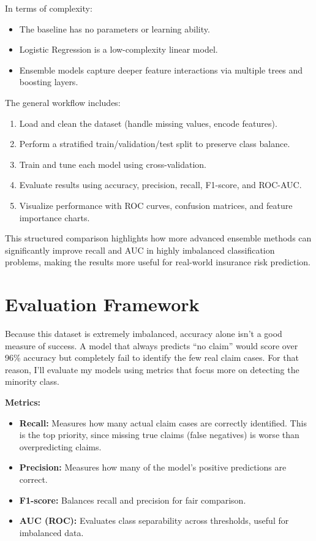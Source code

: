 \documentclass[11pt]{article}
\begin{document}
In terms of complexity:
\begin{itemize}
    \item The baseline has no parameters or learning ability.
    \item Logistic Regression is a low-complexity linear model.
    \item Ensemble models capture deeper feature interactions via multiple trees and boosting layers.
\end{itemize}

The general workflow includes:
\begin{enumerate}
    \item Load and clean the dataset (handle missing values, encode features).
    \item Perform a stratified train/validation/test split to preserve class balance.
    \item Train and tune each model using cross-validation.
    \item Evaluate results using accuracy, precision, recall, F1-score, and ROC-AUC.
    \item Visualize performance with ROC curves, confusion matrices, and feature importance charts.
\end{enumerate}

This structured comparison highlights how more advanced ensemble methods can significantly improve recall and AUC in highly imbalanced classification problems, making the results more useful for real-world insurance risk prediction.

\section{Evaluation Framework}
Because this dataset is extremely imbalanced, accuracy alone isn’t a good measure of success. A model that always predicts “no claim” would score over 96\% accuracy but completely fail to identify the few real claim cases. For that reason, I’ll evaluate my models using metrics that focus more on detecting the minority class.

\textbf{Metrics:}
\begin{itemize}
    \item \textbf{Recall:} Measures how many actual claim cases are correctly identified. This is the top priority, since missing true claims (false negatives) is worse than overpredicting claims.
    \item \textbf{Precision:} Measures how many of the model’s positive predictions are correct.
    \item \textbf{F1-score:} Balances recall and precision for fair comparison.
    \item \textbf{AUC (ROC):} Evaluates class separability across thresholds, useful for imbalanced data.
\end{itemize}
\end{document}

